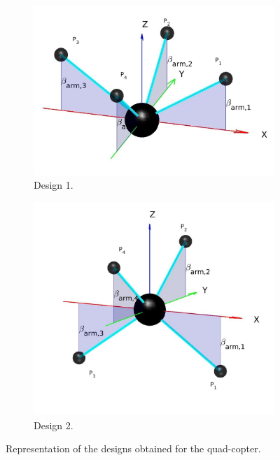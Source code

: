 \begin{figure}[!ht]
  \begin{center}
  \begin{subfigure}[b]{0.43\textwidth}
    \includegraphics[width=\linewidth]{images/Quadcopter2.jpg}
    \caption{Design 1.} \label{fig:Quadcopter_1}
  \end{subfigure}
  \hspace*{\fill} %
  \begin{subfigure}[b]{0.38\textwidth}
    \includegraphics[width=\linewidth]{images/Quadcopter.jpg}
    \caption{Design 2.} \label{fig:Quadcopter_2}
  \end{subfigure}
  \caption{Representation of the designs obtained for the quad-copter.}
  \label{fig:Quadcopter_result}
\end{center}
\end{figure}

